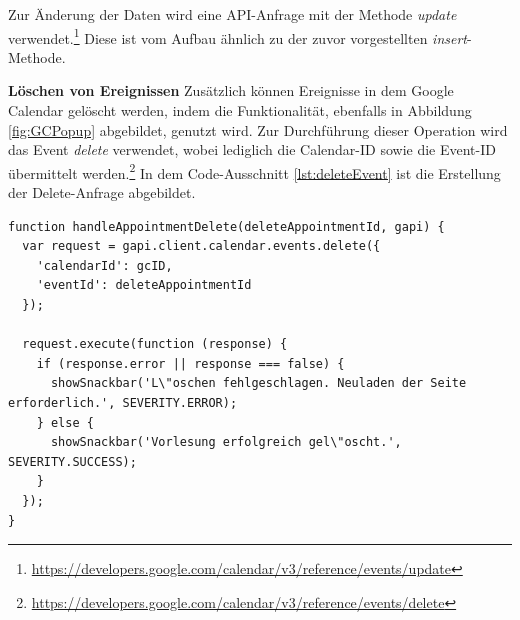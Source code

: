 Zur Änderung der Daten wird eine \ac{API}-Anfrage mit der Methode \textit{update} verwendet.\footnote{\url{https://developers.google.com/calendar/v3/reference/events/update}} 
Diese ist vom Aufbau ähnlich zu der zuvor vorgestellten \textit{insert}-Methode.

\textbf{Löschen von Ereignissen}\newline
Zusätzlich können Ereignisse in dem Google Calendar gelöscht werden, indem die Funktionalität, ebenfalls in Abbildung \vref{fig:GCPopup} abgebildet, genutzt wird. 
Zur Durchführung dieser Operation wird das Event \textit{delete} verwendet, wobei lediglich die Calendar-ID sowie die Event-ID übermittelt werden.\footnote{\url{https://developers.google.com/calendar/v3/reference/events/delete}}   
In dem Code-Ausschnitt \vref{lst:deleteEvent} ist die Erstellung der Delete-Anfrage abgebildet.

\lstset{language=JavaScript}
\begin{lstlisting}[caption={Anfrage zum Löschen eines Ereignisses}, label={lst:deleteEvent}]
function handleAppointmentDelete(deleteAppointmentId, gapi) {
  var request = gapi.client.calendar.events.delete({
    'calendarId': gcID,
    'eventId': deleteAppointmentId
  });

  request.execute(function (response) {
    if (response.error || response === false) {
      showSnackbar('L\"oschen fehlgeschlagen. Neuladen der Seite erforderlich.', SEVERITY.ERROR);
    } else {
      showSnackbar('Vorlesung erfolgreich gel\"oscht.', SEVERITY.SUCCESS);
    }
  });
}
\end{lstlisting}
